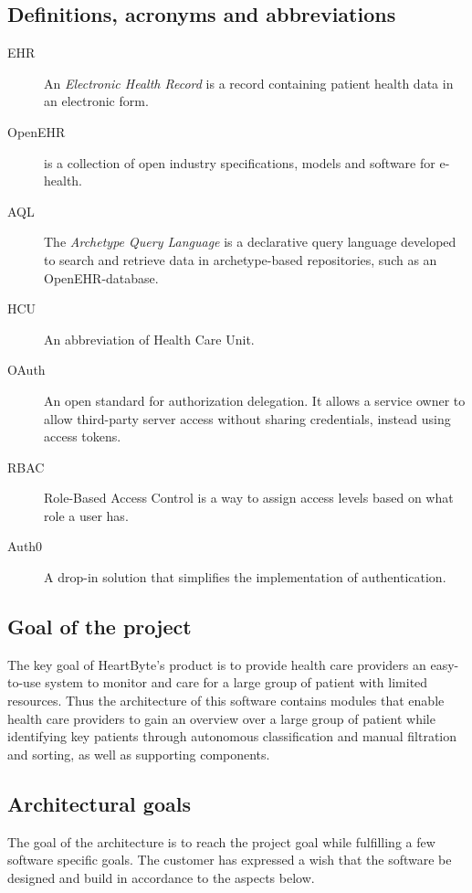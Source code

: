 \documentclass{article}
\begin{document}
\subsection{Definitions, acronyms and abbreviations}
\begin{description}
\item [EHR] An \emph{Electronic Health Record} is a record containing patient health data in an electronic form.
\item [OpenEHR] is a collection of open industry specifications, models and software for e-health.
\item [AQL] The \emph{Archetype Query Language} is a declarative query language developed to search and retrieve data in archetype-based repositories, such as an OpenEHR-database.
\item [HCU] An abbreviation of Health Care Unit.
\item [OAuth] An open standard for authorization delegation. It allows a service owner to allow third-party server access without sharing credentials, instead using access tokens. 
\item [RBAC] Role-Based Access Control is a way to assign access levels based on what role a user has.
\item [Auth0] A drop-in solution that simplifies the implementation of authentication.
\end{description}

\subsection{Goal of the project}
The key goal of HeartByte's product is to provide health care providers an easy-to-use system to monitor and care for a large group of patient with limited resources. Thus the architecture of this software contains modules that enable health care providers to gain an overview over a large group of patient while identifying key patients through autonomous classification and manual filtration and sorting, as well as supporting components.

\subsection{Architectural goals}
The goal of the architecture is to reach the project goal while fulfilling a few software specific goals. The customer has expressed a wish that the software be designed and build in accordance to the aspects below.
\end{document}
